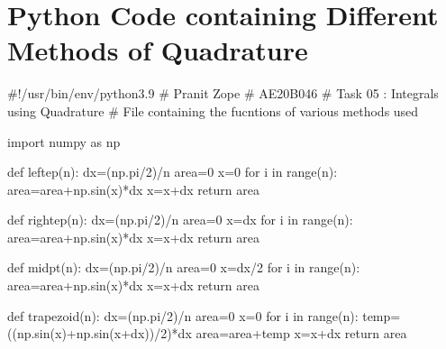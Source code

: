 \documentclass[12pt]{article}
\begin{document}
\section{Python Code containing Different Methods of Quadrature}
\begin{python}
#!/usr/bin/env/python3.9
# Pranit Zope
# AE20B046
# Task 05 : Integrals using Quadrature
# File containing the fucntions of various methods used

import numpy as np

def leftep(n):
    dx=(np.pi/2)/n
    area=0
    x=0
    for i in range(n):
        area=area+np.sin(x)*dx
        x=x+dx
    return area

def rightep(n):
    dx=(np.pi/2)/n
    area=0
    x=dx
    for i in range(n):
        area=area+np.sin(x)*dx
        x=x+dx
    return area

def midpt(n):
    dx=(np.pi/2)/n
    area=0
    x=dx/2
    for i in range(n):
        area=area+np.sin(x)*dx
        x=x+dx
    return area

def trapezoid(n):
    dx=(np.pi/2)/n
    area=0
    x=0
    for i in range(n):
        temp=((np.sin(x)+np.sin(x+dx))/2)*dx
        area=area+temp
        x=x+dx
    return area

\end{python}
\end{document}
